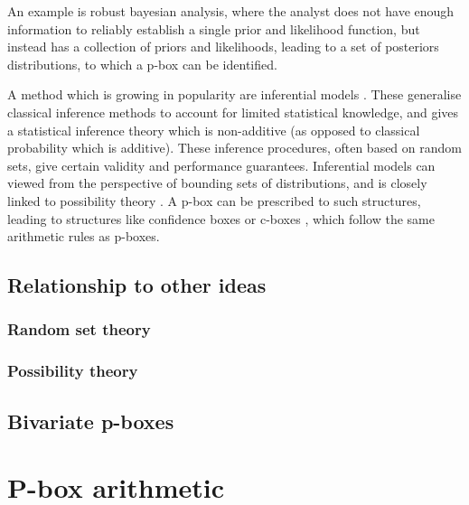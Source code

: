 \documentclass{juliacon}
\begin{document}
An example is robust bayesian analysis, where the analyst does not have enough information to reliably establish a single prior and likelihood function, but instead has a collection of priors and likelihoods, leading to a set of posteriors distributions, to which a p-box can be identified.

A method which is growing in popularity are inferential models \cite{martin2015inferential}. These generalise classical inference methods to account for limited statistical knowledge, and gives a statistical inference theory which is non-additive (as opposed to classical probability which is additive). These inference procedures, often based on random sets, give certain validity and performance guarantees. Inferential models can viewed from the perspective of bounding sets of distributions, and is closely linked to possibility theory \cite{liu2020inferential}. A p-box can be prescribed to such structures, leading to structures like confidence boxes or c-boxes \cite{fersoncomputing}, which follow the same arithmetic rules as p-boxes. 

\subsection{Relationship to other ideas}

\subsubsection{Random set theory}

\subsubsection{Possibility theory}




\subsection{Bivariate p-boxes}


\section{P-box arithmetic}
\label{sec:pboxarithmetic}
\end{document}

